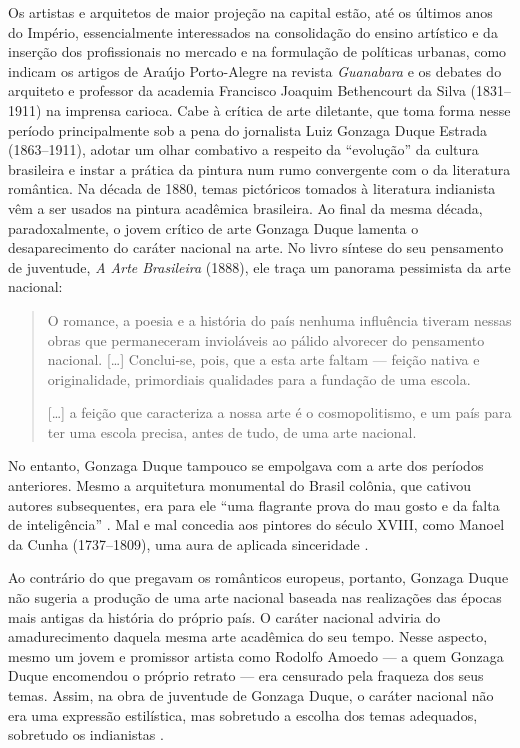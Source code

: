 Os artistas e arquitetos de maior projeção na capital estão, até os
últimos anos do Império, essencialmente interessados na consolidação do
ensino artístico e da inserção dos profissionais no mercado e na
formulação de políticas urbanas, como indicam os artigos de Araújo
Porto-Alegre na revista \emph{Guanabara} e os debates do arquiteto e
professor da academia Francisco Joaquim Bethencourt da Silva
(1831--1911) na imprensa carioca. Cabe à crítica de arte diletante, que
toma forma nesse período principalmente sob a pena do jornalista Luiz
Gonzaga Duque Estrada (1863--1911), adotar um olhar combativo a respeito
da ``evolução'' da cultura brasileira e instar a prática da pintura num
rumo convergente com o da literatura romântica. Na década de 1880, temas
pictóricos tomados à literatura indianista vêm a ser usados na pintura
acadêmica brasileira. Ao final da mesma década, paradoxalmente, o jovem
crítico de arte Gonzaga Duque lamenta o desaparecimento do caráter
nacional na arte. No livro síntese do seu pensamento de juventude,
\emph{A Arte Brasileira} (1888), ele traça um panorama pessimista da
arte nacional:

\begin{quote}
O romance, a poesia e a história do país nenhuma influência tiveram
nessas obras que permaneceram invioláveis ao pálido alvorecer do
pensamento nacional. {[}\ldots{]} Conclui-se, pois, que a esta arte
faltam --- feição nativa e originalidade, primordiais qualidades para a
fundação de uma escola.

{[}\ldots{]} a feição que caracteriza a nossa arte é o cosmopolitismo, e
um país para ter uma escola precisa, antes de tudo, de uma arte
nacional. \autocite[p.~258--259]{gonzagaduque:1995arte}
\end{quote}

No entanto, Gonzaga Duque tampouco se empolgava com a arte dos períodos
anteriores. Mesmo a arquitetura monumental do Brasil colônia, que
cativou autores subsequentes, era para ele ``uma flagrante prova do mau
gosto e da falta de inteligência''
\autocite[p.~74]{gonzagaduque:1995arte}. Mal e mal concedia aos pintores
do século XVIII, como Manoel da Cunha (1737--1809), uma aura de aplicada
sinceridade \autocite[ p.~81]{gonzagaduque:1995arte}.

Ao contrário do que pregavam os românticos europeus, portanto, Gonzaga
Duque não sugeria a produção de uma arte nacional baseada nas
realizações das épocas mais antigas da história do próprio país. O
caráter nacional adviria do amadurecimento daquela mesma arte acadêmica
do seu tempo. Nesse aspecto, mesmo um jovem e promissor artista como
Rodolfo Amoedo --- a quem Gonzaga Duque encomendou o próprio retrato ---
era censurado pela fraqueza dos seus temas. Assim, na obra de juventude
de Gonzaga Duque, o caráter nacional não era uma expressão estilística,
mas sobretudo a escolha dos temas adequados, sobretudo os indianistas
\autocite[p.~185]{gonzagaduque:1995arte}.


